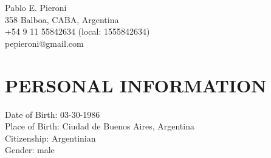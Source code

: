 \documentclass[letterpaper]{article}
\def\name{Pablo E. Pieroni}
\begin{document}
\begin{flushright}
{\huge \name}\\
   358 Balboa, CABA, Argentina\\
   +54 9 11 55842634 (local: 1555842634)\\
   pepieroni@gmail.com
\end{flushright}

\vspace{0.25in}



\section*{PERSONAL INFORMATION}
   Date of Birth: 03-30-1986\\
   Place of Birth: Ciudad de Buenos Aires, Argentina\\
   Citizenship: Argentinian\\
   Gender: male
\end{document}
